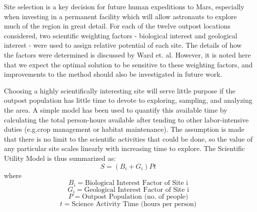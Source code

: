 \documentclass[]{aiaa-pretty}
\begin{document}
Site selection is a key decision for future human expeditions to Mars, especially when investing in a permanent facility which will allow astronauts to explore much of the region in great detail. For each of the twelve outpost locations considered, two scientific weighting factors - biological interest and geological interest - were used to assign relative potential of each site. The details of how the factors were determined is discussed by Ward et. al. \cite{ward2015} However, it is noted here that we expect the optimal solution to be sensitive to these weighting factors, and improvements to the method should also be investigated in future work.

Choosing a highly scientifically interesting site will serve little purpose if the outpost population has little time to devote to exploring, sampling, and analyzing the area. A simple model has been used to quantify this available time by calculating the total person-hours available after tending to other labor-intensive duties (e.g.crop management or habitat maintenance). The assumption is made that there is no limit to the scientific activities that could be done, so the value of any particular site scales linearly with increasing time to explore. 
The Scientific Utility Model is thus summarized as:
\begin{equation*}
S=(B_i + G_i) P t
\end{equation*}
where
\begin{equation*}
B_i = \text{Biological Interest Factor of Site i}
\end{equation*}
\begin{equation*}
G_i = \text{Geological Interest Factor of Site i}
\end{equation*}
\begin{equation*}
P = \text{Outpost Population (no. of people)}
\end{equation*}
\begin{equation*}
t = \text{Science Activity Time (hours per person)}
\end{equation*}
\end{document}
